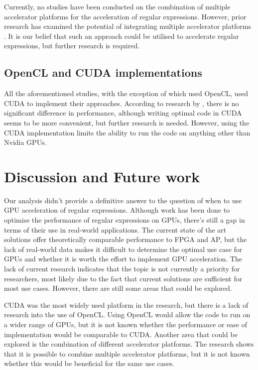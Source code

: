 \documentclass[10pt,onecolumn,twoside,english,a4paper]{article}
\begin{document}
Currently, no studies have been conducted on the combination of multiple accelerator platforms for the acceleration of regular expressions. However, prior research has examined the potential of integrating multiple accelerator platforms \cite{kobayashi2019gpu}. It is our belief that such an approach could be utilised to accelerate regular expressions, but further research is required.

\subsection{OpenCL and CUDA implementations} \label{OpenCL and CUDA implementations:Results}
All the aforementioned studies, with the exception of \cite{rosciszewski2014regular} which used OpenCL, used CUDA to implement their approaches. According to research by \cite{Fang:Comparison-cuda-opencl}, there is no significant difference in performance, although writing optimal code in CUDA seems to be more convenient, but further research is needed.
However, using the CUDA implementation limits the ability to run the code on anything other than Nvidia GPUs.

\section{Discussion and Future work} \label{Discussion and Future work}
Our analysis didn't provide a definitive answer to the question of when to use GPU acceleration of regular expressions. Although work has been done to optimise the performance of regular expressions on GPUs, there's still a gap in terms of their use in real-world applications. The current state of the art solutions offer theoretically comparable performance to FPGA and AP, but the lack of real-world data makes it difficult to determine the optimal use case for GPUs and whether it is worth the effort to implement GPU acceleration. The lack of current research indicates that the topic is not currently a priority for researchers, most likely due to the fact that current solutions are sufficient for most use cases. However, there are still some areas that could be explored.


CUDA was the most widely used platform in the research, but there is a lack of research into the use of OpenCL. Using OpenCL would allow the code to run on a wider range of GPUs, but it is not known whether the performance or ease of implementation would be comparable to CUDA.
Another area that could be explored is the combination of different accelerator platforms. The research shows that it is possible to combine multiple accelerator platforms, but it is not known whether this would be beneficial for the same use cases.
\end{document}

